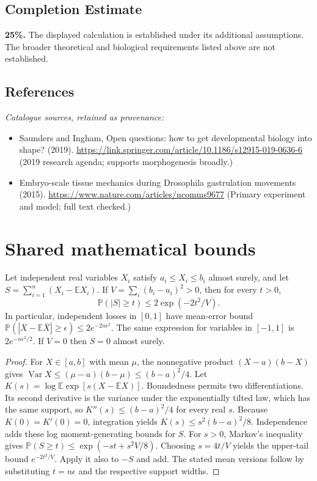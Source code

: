 \documentclass[11pt]{article}
\begin{document}
\subsection{Completion Estimate}
\textbf{25\%.} The displayed calculation is established under its additional assumptions. The broader theoretical and biological requirements listed above are not established.
\subsection{References}
\noindent\emph{Catalogue sources, retained as provenance:}
\begin{itemize}
\item Saunders and Ingham, Open questions: how to get developmental biology into shape? (2019). \url{https://link.springer.com/article/10.1186/s12915-019-0636-6} (2019 research agenda; supports morphogenesis broadly.)
\item Embryo-scale tissue mechanics during Drosophila gastrulation movements (2015). \url{https://www.nature.com/articles/ncomms9677} (Primary experiment and model; full text checked.)
\end{itemize}




\section{Shared mathematical bounds}\label{app:bounds}
\begin{lemma}\label{lem:bounded}
Let independent real variables $X_i$ satisfy $a_i\leq X_i\leq b_i$ almost surely,
and let $S=\sum_{i=1}^n(X_i-\mathbb{E} X_i)$. If
$V=\sum_i(b_i-a_i)^2>0$, then for every $t>0$,
\[
 \mathbb{P}(|S|\geq t)\leq 2\exp(-2t^2/V).
\]
In particular, independent losses in $[0,1]$ have mean-error bound
$\mathbb{P}(|\overline X-\mathbb{E}\overline X|\geq\epsilon)
\leq2e^{-2n\epsilon^2}$. The same expression for variables in $[-1,1]$
is $2e^{-n\epsilon^2/2}$. If $V=0$ then $S=0$ almost surely.
\end{lemma}
\begin{proof}
For $X\in[a,b]$ with mean $\mu$, the nonnegative product
$(X-a)(b-X)$ gives
$\operatorname{Var} X\leq(\mu-a)(b-\mu)\leq(b-a)^2/4$.
Let $K(s)=\log\mathbb{E}\exp[s(X-\mathbb{E} X)]$.
Boundedness permits two differentiations. Its second derivative is the variance
under the exponentially tilted law, which has the same support, so
$K''(s)\leq(b-a)^2/4$ for every real $s$.
Because $K(0)=K'(0)=0$, integration yields
$K(s)\leq s^2(b-a)^2/8$.
Independence adds these log moment-generating bounds for $S$.
For $s>0$, Markov's inequality gives
$\mathbb{P}(S\geq t)\leq\exp(-st+s^2V/8)$.
Choosing $s=4t/V$ yields the upper-tail bound $e^{-2t^2/V}$.
Apply it also to $-S$ and add. The stated mean versions follow by substituting
$t=n\epsilon$ and the respective support widths.
\end{proof}
\end{document}
